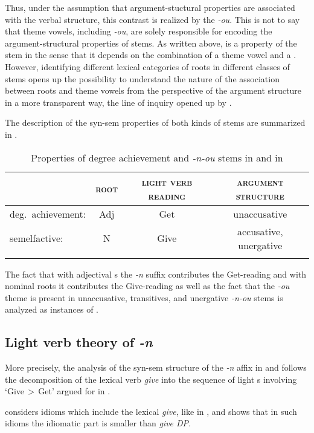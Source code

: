  Thus, under the assumption that argument-stuctural properties are associated with the verbal structure, this contrast is realized by the  \textit{-ou}. This is not to say that theme vowels, including \textit{-ou}, are solely responsible for encoding the argument-structural properties of  stems. As written above,  is a property of the stem in the sense that it depends on the combination of a theme vowel and a . However, identifying different lexical categories of roots in different classes of stems opens up the possibility to understand the nature of the association between roots and theme vowels from the perspective of the argument structure in a more transparent way, the line of inquiry opened up by \cite{Jablonska2007}.
\par The description of the syn-sem properties of both kinds of stems are summarized in  .

\begin{table}
\caption{Properties of degree achievement and   \textit{-n-ou} stems in  and  in \cite{NU}}
\label{tab:summary}
\begin{tabular}{ l  c  c  c }
\lsptoprule		
				& \textsc{root} 	& \textsc{light verb reading}	& \textsc{argument structure}\\\hline
deg.\ achievement: 	& Adj	& Get  				& unaccusative\\
 semelfactive: 		& N   	& Give 				& accusative, unergative\\
\lspbottomrule
\end{tabular}
\end{table}



The fact that with adjectival s the \textit{-n} suffix contributes the Get-reading  and with nominal roots it contributes the Give-reading  as well as the fact that the \textit{-ou} theme is present in unaccusative, transitives, and unergative \textit{-n-ou} stems is analyzed as instances of .

\subsection{Light verb theory of \textit{-n}}

More precisely, the analysis  of the syn-sem structure of the \textit{-n} affix in  and  follows the decomposition of the  lexical verb \textit{give} into the sequence of light s involving `Give\,$>$\,Get' argued for in \cite{Richards2001}.
\par
\cite{Richards2001} considers  idioms which include the lexical \textit{give}, like in \Next, and shows that in such idioms the idiomatic part is smaller than \textit{give DP}.

